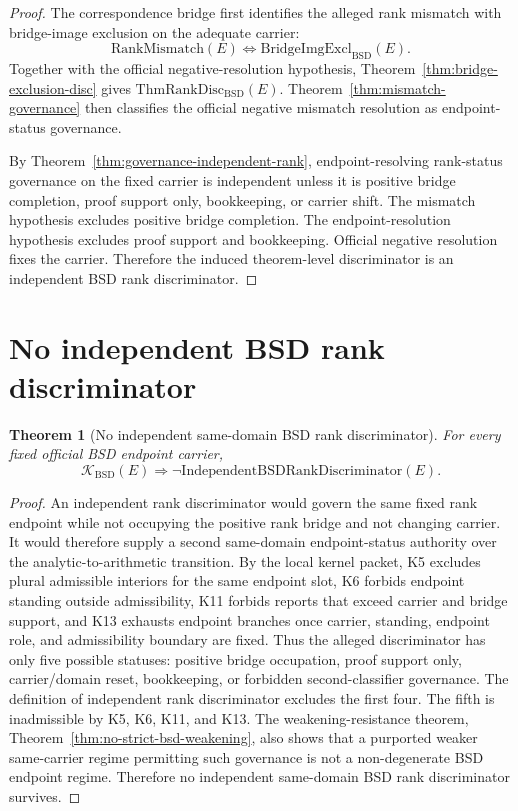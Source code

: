 \documentclass[11pt]{article}
\newtheorem{theorem}{Theorem}[section]
\newcommand{\BSD}{\mathrm{BSD}}
\newcommand{\RankMismatch}{\mathrm{RankMismatch}}
\newcommand{\BridgeImgExcl}{\mathrm{BridgeImgExcl}_{\BSD}}
\newcommand{\ThmRankDisc}{\mathrm{ThmRankDisc}_{\BSD}}
\newcommand{\Kern}{\mathcal{K}}
\begin{document}
\begin{proof}
The correspondence bridge first identifies the alleged rank mismatch with bridge-image exclusion on the adequate carrier:
\[
\RankMismatch(E)\Longleftrightarrow \BridgeImgExcl(E).
\]
Together with the official negative-resolution hypothesis, Theorem~\ref{thm:bridge-exclusion-disc} gives $\ThmRankDisc(E)$. Theorem~\ref{thm:mismatch-governance} then classifies the official negative mismatch resolution as endpoint-status governance.

By Theorem~\ref{thm:governance-independent-rank}, endpoint-resolving rank-status governance on the fixed carrier is independent unless it is positive bridge completion, proof support only, bookkeeping, or carrier shift. The mismatch hypothesis excludes positive bridge completion. The endpoint-resolution hypothesis excludes proof support and bookkeeping. Official negative resolution fixes the carrier. Therefore the induced theorem-level discriminator is an independent BSD rank discriminator.
\end{proof}

\section{No independent BSD rank discriminator}

\begin{theorem}[No independent same-domain BSD rank discriminator]\label{thm:no-independent-rank-disc}
For every fixed official BSD endpoint carrier,
\[
\Kern_{\BSD}(E)
\Rightarrow
\neg\mathrm{IndependentBSDRankDiscriminator}(E).
\]
\end{theorem}

\begin{proof}
An independent rank discriminator would govern the same fixed rank endpoint while not occupying the positive rank bridge and not changing carrier. It would therefore supply a second same-domain endpoint-status authority over the analytic-to-arithmetic transition. By the local kernel packet, K5 excludes plural admissible interiors for the same endpoint slot, K6 forbids endpoint standing outside admissibility, K11 forbids reports that exceed carrier and bridge support, and K13 exhausts endpoint branches once carrier, standing, endpoint role, and admissibility boundary are fixed. Thus the alleged discriminator has only five possible statuses: positive bridge occupation, proof support only, carrier/domain reset, bookkeeping, or forbidden second-classifier governance. The definition of independent rank discriminator excludes the first four. The fifth is inadmissible by K5, K6, K11, and K13. The weakening-resistance theorem, Theorem~\ref{thm:no-strict-bsd-weakening}, also shows that a purported weaker same-carrier regime permitting such governance is not a non-degenerate BSD endpoint regime. Therefore no independent same-domain BSD rank discriminator survives.
\end{proof}
\end{document}
